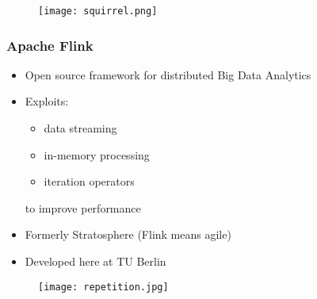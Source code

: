 \begin{frame}
\begin{figure}
	\centering
	\texttt{[image: squirrel.png]}
	\caption*{\cite{squirrel}}
\end{figure}
\end{frame}

\begin{frame}
\frametitle{Apache Flink}
\begin{itemize}
\item Open source framework for distributed Big Data Analytics
\item Exploits:
	\begin{itemize}
	\item data streaming
	\item in-memory processing
	\item iteration operators
	\end{itemize}
to improve performance
\item Formerly Stratosphere (Flink means agile)
\item Developed here at TU Berlin
\end{itemize}
\end{frame}

\begin{frame}
\begin{figure}
	\centering
	\texttt{[image: repetition.jpg]}
	\caption*{\cite{repetition}}
\end{figure}
\end{frame}

